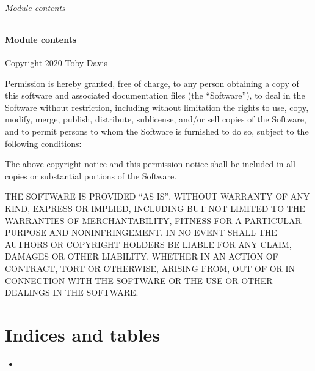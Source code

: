\documentclass[letterpaper,10pt,english]{sphinxmanual}
\begin{document}
\subparagraph{Module contents}
\label{\detokenize{libpymath.src:module-libpymath.src}}\label{\detokenize{libpymath.src:module-contents}}

\subsubsection{Module contents}
\label{\detokenize{libpymath:module-libpymath}}\label{\detokenize{libpymath:module-contents}}
Copyright 2020 Toby Davis

Permission is hereby granted, free of charge, to any person obtaining a copy of
this software and associated documentation files (the “Software”), to deal in
the Software without restriction, including without limitation the rights to
use, copy, modify, merge, publish, distribute, sublicense, and/or sell copies
of the Software, and to permit persons to whom the Software is furnished to do
so, subject to the following conditions:

The above copyright notice and this permission notice shall be included in all
copies or substantial portions of the Software.

THE SOFTWARE IS PROVIDED “AS IS”, WITHOUT WARRANTY OF ANY KIND, EXPRESS OR
IMPLIED, INCLUDING BUT NOT LIMITED TO THE WARRANTIES OF MERCHANTABILITY, FITNESS
FOR A PARTICULAR PURPOSE AND NONINFRINGEMENT. IN NO EVENT SHALL THE AUTHORS OR
COPYRIGHT HOLDERS BE LIABLE FOR ANY CLAIM, DAMAGES OR OTHER LIABILITY, WHETHER
IN AN ACTION OF CONTRACT, TORT OR OTHERWISE, ARISING FROM, OUT OF OR IN
CONNECTION WITH THE SOFTWARE OR THE USE OR OTHER DEALINGS IN THE SOFTWARE.


\chapter{Indices and tables}
\label{\detokenize{index:indices-and-tables}}\begin{itemize}
\item {} 

\end{itemize}
\end{document}
